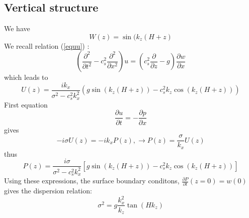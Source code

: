 \documentclass[a4paper]{article}
\numberwithin{equation}{section}
\begin{document}
\subsection{Vertical structure}
We have 
\[
W(z)=\sin(k_z(H+z)
\]
We recall relation (\ref{equu}) :
\[
\left(
\frac{\partial^2 }{\partial t^2}-c_s^2\frac{\partial^2}{\partial x^2}
\right)u
=
\left(
c_s^2\frac{\partial}{\partial z}-g
\right)\frac{\partial w}{\partial x}
\]
which leads to
\[
U(z)=\frac{ik_x}{\sigma^2-c_s^2k_x^2}\left(
g\sin(k_z(H+z))-c_s^2k_z\cos(k_z(H+z))
\right)
\]
First equation
\[
\frac{\partial u}{\partial t}=-\frac{\partial p}{\partial x}
\]
gives
\[
-i\sigma U(z)=-ik_xP(z), \rightarrow P(z)=\frac{\sigma}{k_x}U(z)
\]
thus
\[
P(z)=\frac{i\sigma}{\sigma^2-c_s^2k_x^2}\left[
g\sin(k_z(H+z))-c_s^2k_z\cos(k_z(H+z))
\right]
\]
Using these expressions, the surface boundary conditons, $\frac{\partial P}{\partial t}(z=0)=w(0)$ gives the dispersion relation:
\[
\sigma^2=g\frac{k_x^2}{k_z}\tan(Hk_z)
\]
\end{document}
